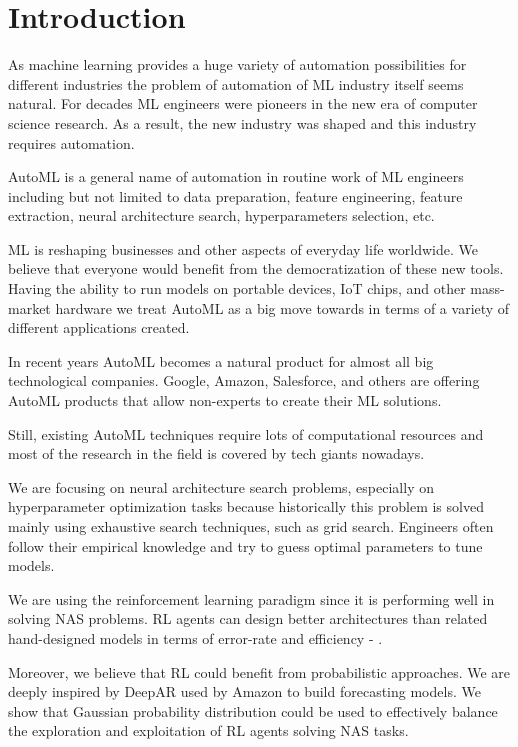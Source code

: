 \chapter{Introduction}

As machine learning provides a huge variety of automation possibilities for different industries the problem of automation of ML industry itself seems natural. For decades ML engineers were pioneers in the new era of computer science research. As a result, the new industry was shaped and this industry requires automation.

AutoML is a general name of automation in routine work of ML engineers including but not limited to data preparation, feature engineering, feature extraction, neural architecture search, hyperparameters selection, etc.

ML is reshaping businesses and other aspects of everyday life worldwide. We believe that everyone would benefit from the democratization of these new tools. Having the ability to run models on portable devices, IoT chips, and other mass-market hardware we treat AutoML as a big move towards in terms of a variety of different applications created.

In recent years AutoML becomes a natural product for almost all big technological companies. Google, Amazon, Salesforce, and others are offering AutoML products that allow non-experts to create their ML solutions.

Still, existing AutoML techniques require lots of computational resources and most of the research in the field is covered by tech giants nowadays. 

We are focusing on neural architecture search problems, especially on hyperparameter optimization tasks because historically this problem is solved mainly using exhaustive search techniques, such as grid search. Engineers often follow their empirical knowledge and try to guess optimal parameters to tune models.

We are using the reinforcement learning paradigm since it is performing well in solving NAS problems. RL agents can design better architectures than related hand-designed models in terms of error-rate and efficiency - \cite[see][]{ZophL16}.

Moreover, we believe that RL could benefit from probabilistic approaches. We are deeply inspired by DeepAR \cite[][]{2017arXiv170404110S} used by Amazon to build forecasting models. We show that Gaussian probability distribution could be used to effectively balance the exploration and exploitation of RL agents solving NAS tasks.

\endinput